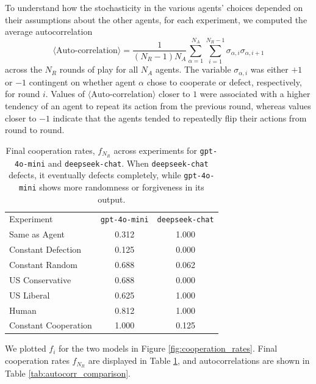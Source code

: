 \documentclass[%
 reprint,
 amsmath,amssymb,
 aps,
]{revtex4-2}
\begin{document}
To understand how the stochasticity in the various agents' choices depended on their assumptions about the other agents, for each experiment, we computed the average autocorrelation
\begin{equation}
    \langle \text{Auto-correlation}\rangle = \frac{1}{(N_R-1)N_A}\sum_{\alpha=1}^{N_A}\sum_{i=1}^{N_R-1}\sigma_{\alpha, i}\sigma_{\alpha, i+1}
\end{equation}
 across the $N_R$ rounds of play for all $N_A$ agents. The variable $\sigma_{\alpha, i}$  was either $+1$ or $-1$ contingent on whether agent $\alpha$ chose to cooperate or defect, respectively, for round $i$. Values of $\langle \text{Auto-correlation}\rangle$ closer to $1$ were associated with a higher tendency of an agent to repeat its action from the previous round, whereas values closer to $-1$ indicate that the agents tended to repeatedly flip their actions from round to round.

\begin{table}[t]
\begin{ruledtabular}
\begin{tabular}{lcc}
\textrm{Experiment} & \texttt{gpt-4o-mini} & \texttt{deepseek-chat} \\
\colrule
Same as Agent        & 0.312 & 1.000 \\
Constant Defection   & 0.125 & 0.000 \\
Constant Random      & 0.688 & 0.062 \\
US Conservative      & 0.688 & 0.000 \\
US Liberal           & 0.625 & 1.000 \\
Human                & 0.812 & 1.000 \\
Constant Cooperation & 1.000 & 0.125 \\
\end{tabular}
\end{ruledtabular}
\caption{\label{tab:coop_results} Final cooperation rates, $f_{N_R}$ across experiments 
for \texttt{gpt-4o-mini} and \texttt{deepseek-chat}. When \texttt{deepseek-chat} defects, it eventually defects completely, while \texttt{gpt-4o-mini} shows more randomness or forgiveness in its output. }
\end{table}

We plotted $f_i$ for the two models in Figure \ref{fig:cooperation_rates}. Final cooperation rates $f_{N_R}$ are displayed in Table \ref{tab:coop_results}, and autocorrelations are shown in Table \ref{tab:autocorr_comparison}.
\end{document}
